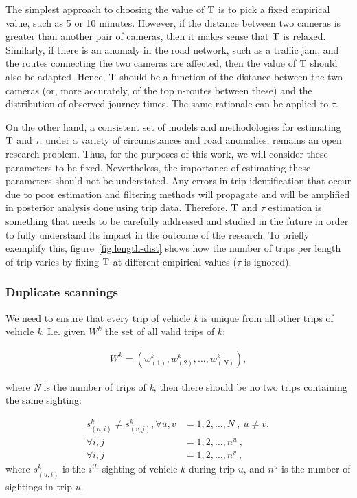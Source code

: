 The simplest approach to choosing the value of $\mathrm{T}$ is to pick a fixed empirical value, such as 5 or 10 minutes. However, if the distance between two cameras is greater than another pair of cameras, then it makes sense that $\mathrm{T}$ is relaxed. Similarly, if there is an anomaly in the road network, such as a traffic jam, and the routes connecting the two cameras are affected, then the value of $\mathrm{T}$ should also be adapted. Hence, $\mathrm{T}$ should be a function of the distance between the two cameras (or, more accurately, of the top n-routes between these) and the distribution of observed journey times. The same rationale can be applied to $\tau$.

On the other hand, a consistent set of models and methodologies for estimating $\mathrm{T}$ and $\tau$, under a variety of circumstances and road anomalies, remains an open research problem. Thus, for the purposes of this work, we will consider these parameters to be fixed. Nevertheless, the importance of estimating these parameters should not be understated. Any errors in trip identification that occur due to poor estimation and filtering methods will propagate and will be amplified in posterior analysis done using trip data. Therefore, $\mathrm{T}$ and $\tau$ estimation is something that needs to be carefully addressed and studied in the future in order to fully understand its impact in the outcome of the research. To briefly exemplify this, figure~\ref{fig:length-dist} shows how the number of trips per length of trip varies by fixing $\mathrm{T}$ at different empirical values ($\tau$ is ignored).

\subsubsection*{Duplicate scannings}

We need to ensure that every trip of vehicle \emph{k} is unique from all other trips of vehicle \emph{k}. I.e. given $W^k$ the set of all valid trips of $k$:

\begin{align}
W^{k} = \left( w^{k}_{(1)}, w^{k}_{(2)}, \ldots, w^{k}_{(N)} \right) \label{e.trip.history},
\end{align}

where \emph{N} is the number of trips of \emph{k}, then there should be no two trips containing the same sighting:

\begin{align}
s^{k}_{(u,i)} \neq s^{k}_{(v,j)}, \forall u,v &= 1, 2, \ldots, N \ , \ u \neq v,  \label{e.trip.history.constraint} \\
\forall i,j &= 1, 2, \ldots, n^u \ ,\nonumber \\
\forall i,j &= 1, 2, \ldots, n^v \ , \nonumber
\end{align}
where $s_{(u,i)}^k$ is the $i^{th}$ sighting of vehicle $k$ during trip $u$, and $n^u$ is the number of sightings in trip $u$.

